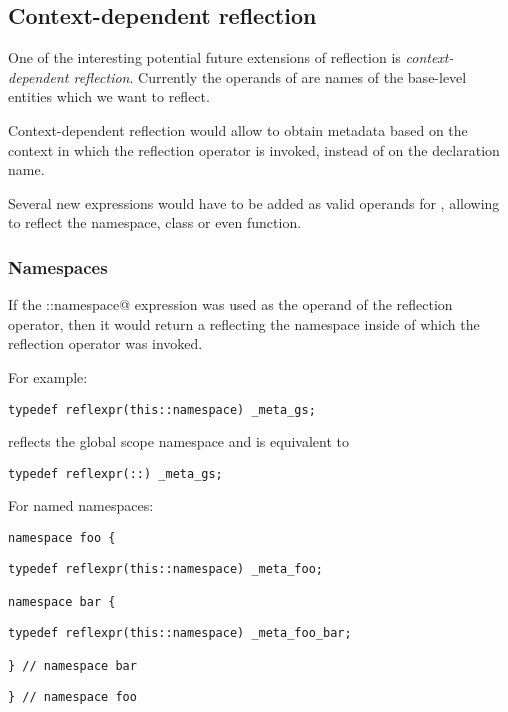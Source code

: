 \subsection{Context-dependent reflection}
\label{context-dependent-reflection}

One of the interesting potential future extensions of reflection
is {\em context-dependent reflection}. Currently the operands of \verb@reflexpr@
are names of the base-level entities which we want to reflect.

Context-dependent reflection would allow to obtain metadata based on the context
in which the reflection operator is invoked, instead of on the declaration name.

Several new expressions would have to be added as valid operands for
\verb@reflexpr@, allowing to reflect the  namespace, class
or even function.

\subsubsection{Namespaces}

If the \verb@this::namespace@ expression was used as the operand of the reflection
operator, then it would return a  reflecting the namespace
inside of which the reflection operator was invoked.

For example:

\begin{verbatim}
typedef reflexpr(this::namespace) _meta_gs;
\end{verbatim}

reflects the global scope namespace and is equivalent to

\begin{verbatim}
typedef reflexpr(::) _meta_gs;
\end{verbatim}

For named namespaces:

\begin{verbatim}
namespace foo {
\end{verbatim}
\begin{verbatim}
typedef reflexpr(this::namespace) _meta_foo;

namespace bar {
\end{verbatim}
\begin{verbatim}
typedef reflexpr(this::namespace) _meta_foo_bar;

} // namespace bar
\end{verbatim}
\begin{verbatim}
} // namespace foo
\end{verbatim}

